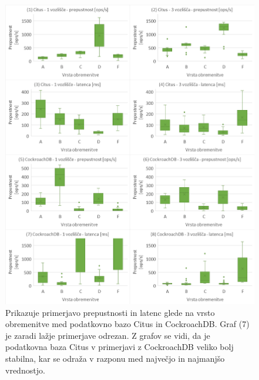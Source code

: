 \documentclass[a4paper, 12pt]{book}
\begin{document}
\newpage

\begin{figure}[H]
\begin{center}
\includegraphics[width=1\textwidth]{resources/comparison-throughputnlatency-bnw.png}
\end{center}
\caption{Prikazuje primerjavo prepustnosti in latenc glede na vrsto obremenitve med podatkovno bazo Citus in CockroachDB. Graf (7) je zaradi lažje primerjave odrezan. Z grafov se vidi, da je podatkovna baza Citus v primerjavi z CockroachDB veliko bolj stabilna, kar se odraža v razponu med največjo in najmanjšo vrednostjo.}
\label{img_ycsb_results_bnw_comparison}
\end{figure}

\newpage
\end{document}
